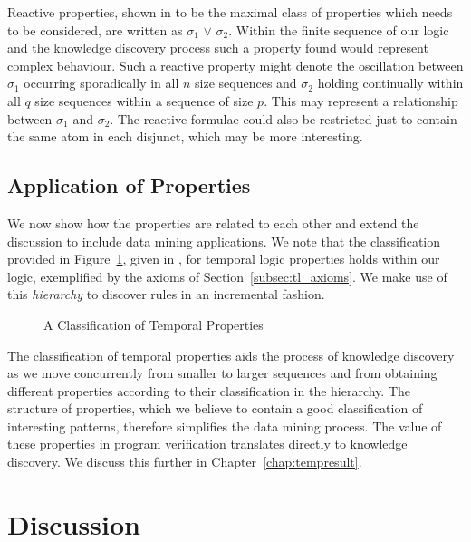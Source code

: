 \medskip

Reactive properties, shown in \cite{mp92} to be the maximal
class of properties which needs to be considered, are written as
 $\sigma_1$ $\vee$  $\sigma_2$. Within the
finite sequence of our logic and the knowledge discovery process such
a property found would represent complex behaviour. Such a reactive
property might denote the oscillation between $\sigma_1$ occurring
sporadically in all $n$ size sequences and $\sigma_2$ holding
continually within all $q$ size sequences within a sequence of size
$p$. This may represent a relationship between $\sigma_1$ and
$\sigma_2$. The reactive formulae could also be restricted just to
contain the same atom in each disjunct, which may be more interesting.


\subsection{Application of Properties}

We now show how the properties are related to each other and extend
the discussion to include data mining applications. We note that
the classification provided in Figure~\ref{fig:Classification}, given
in \cite{mp92}, for temporal logic properties holds within our logic,
exemplified by the axioms of Section~\ref{subsec:tl_axioms}. We make
use of this {\em hierarchy} to discover rules in an incremental fashion.

\begin{figure}[ht]
\centerline{}
\caption{\label{fig:Classification} A Classification of Temporal
Properties}
\end{figure}
The classification of temporal properties aids the process of
knowledge discovery as we move concurrently from smaller to larger
sequences and from obtaining different properties according to their
classification in the hierarchy. The structure of properties, which we
believe to contain a good classification of interesting patterns,
therefore simplifies the data 
mining process. The value of these properties in program verification
translates directly to knowledge discovery. We discuss this further in
Chapter~\ref{chap:tempresult}.  

\section{Discussion}\label{sec:tl_disc}


